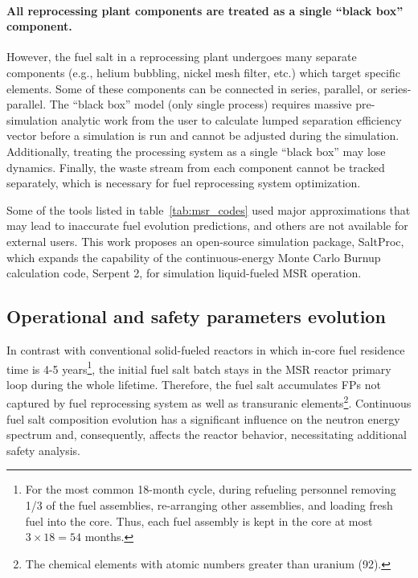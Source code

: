 \paragraph{All reprocessing plant components are treated as a single ``black 
box'' component.} However, the fuel salt in a reprocessing plant undergoes 
many separate components (e.g., helium bubbling, nickel mesh filter, etc.) 
which target specific elements. Some of these components can be connected in 
series, parallel, or series-parallel. The ``black box'' model (only single 
process) requires massive pre-simulation analytic work from the user to 
calculate lumped separation efficiency vector before a simulation is run and 
cannot be adjusted during the simulation. Additionally, treating the 
processing system as a single ``black box'' may lose dynamics. Finally, the 
waste stream from each component cannot be tracked separately, which is 
necessary for fuel reprocessing system optimization.

Some of the tools listed in table~\ref{tab:msr_codes} used major 
approximations that may lead to inaccurate fuel evolution predictions, and 
others are not available for external users. This work proposes an open-source 
simulation package, SaltProc, which expands the capability of the 
continuous-energy Monte Carlo Burnup calculation code, Serpent 2, for 
simulation liquid-fueled \gls{MSR} operation.

\subsection{Operational and safety parameters evolution} 
\label{sec:saf-par-literature}
In contrast with conventional solid-fueled reactors in which in-core fuel 
residence time is 4-5 years\footnote{For the most common 
18-month cycle, during refueling personnel removing 1/3 of the fuel 
assemblies, re-arranging other assemblies, and loading fresh fuel into the 
core. Thus, each fuel assembly is kept in the core at most $3\times 18=54$ 
months.}, the initial fuel salt batch stays in the \gls{MSR} reactor primary 
loop during the whole lifetime. Therefore, the fuel salt accumulates 
\glspl{FP} not captured by fuel reprocessing system as well as transuranic 
elements\footnote{The chemical elements with atomic numbers greater than 
uranium (92).}. Continuous fuel salt composition evolution has a 
significant influence on the neutron energy spectrum and, consequently, 
affects the reactor behavior, necessitating additional safety analysis.


